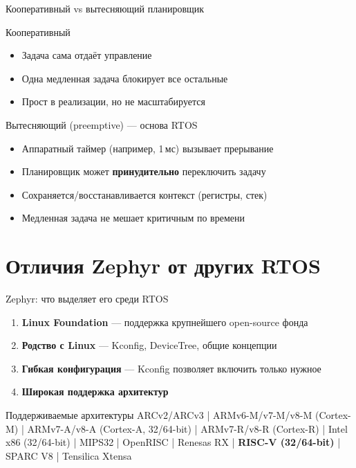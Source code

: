 \documentclass[12pt,aspectratio=169]{beamer}
\begin{document}
\begin{frame}{Кооперативный vs вытесняющий планировщик}
\begin{block}{Кооперативный}
\begin{itemize}
  \item Задача сама отдаёт управление
  \item Одна медленная задача блокирует все остальные
  \item Прост в реализации, но не масштабируется
\end{itemize}
\end{block}

\pause

\begin{block}{Вытесняющий (preemptive) --- основа RTOS}
\begin{itemize}
  \item Аппаратный таймер (например, 1\,мс) вызывает прерывание
  \item Планировщик может \textbf{принудительно} переключить задачу
  \item Сохраняется/восстанавливается контекст (регистры, стек)
  \item Медленная задача не мешает критичным по времени
\end{itemize}
\end{block}
\end{frame}


\section{Отличия Zephyr от других RTOS}

\begin{frame}{Zephyr: что выделяет его среди RTOS}
\begin{enumerate}
  \item \textbf{Linux Foundation} --- поддержка крупнейшего open-source фонда
  \item \textbf{Родство с Linux} --- Kconfig, DeviceTree, общие концепции
  \item \textbf{Гибкая конфигурация} --- Kconfig позволяет включить только нужное
  \item \textbf{Широкая поддержка архитектур}
\end{enumerate}

\pause
\vspace{4pt}
\begin{block}{Поддерживаемые архитектуры}
\footnotesize
ARCv2/ARCv3 \;|\; ARMv6-M/v7-M/v8-M (Cortex-M) \;|\;
ARMv7-A/v8-A (Cortex-A, 32/64-bit) \;|\;
ARMv7-R/v8-R (Cortex-R) \;|\;
Intel x86 (32/64-bit) \;|\; MIPS32 \;|\;
OpenRISC \;|\; Renesas RX \;|\;
\textbf{RISC-V (32/64-bit)} \;|\; SPARC V8 \;|\; Tensilica Xtensa
\end{block}
\end{frame}
\end{document}
